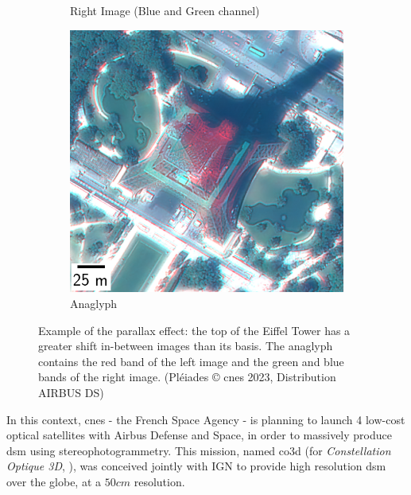 \begin{figure}
\begin{subfigure}[t]{0.32\linewidth}
        \caption{Right Image (Blue and Green channel)}
        \label{fig:eiffel_tower_right}
    \end{subfigure}\hfill
    \begin{subfigure}[t]{0.32\linewidth}
        \flushright
        \includegraphics[width=\linewidth]{Images/0_Intro/eiffel_tower_ana.png}
        \caption{Anaglyph}
        \label{fig:eiffel_tower_ana}
    \end{subfigure}
    \caption{Example of the parallax effect: the top of the Eiffel Tower has a greater shift in-between images than its basis. The anaglyph contains the red band of the left image and the green and blue bands of the right image. (Pléiades © \acrshort{cnes} 2023, Distribution AIRBUS DS)}
    \label{fig:parallax}
\end{figure}


In this context, \acrshort{cnes} - the French Space Agency - is planning to launch 4 low-cost optical satellites with Airbus Defense and Space, in order to massively produce \acrshort{dsm} using stereophotogrammetry. This mission, named \acrshort{co3d} (for \textit{Constellation Optique 3D}, \cite{melet_co3d_2020}), was conceived jointly with IGN to provide high resolution \acrshort{dsm} over the globe, at a $50cm$ resolution.


